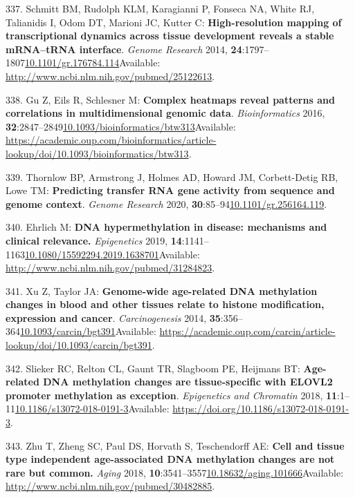 \documentclass[
]{book}
\begin{document}
\leavevmode\hypertarget{ref-Schmitt2014b}{}%
337. Schmitt BM, Rudolph KLM, Karagianni P, Fonseca NA, White RJ, Talianidis I, Odom DT, Marioni JC, Kutter C: \textbf{High-resolution mapping of transcriptional dynamics across tissue development reveals a stable mRNA--tRNA interface}. \emph{Genome Research} 2014, \textbf{24}:1797--1807\href{https://doi.org/10.1101/gr.176784.114}{10.1101/gr.176784.114}Available: \url{http://www.ncbi.nlm.nih.gov/pubmed/25122613}.

\leavevmode\hypertarget{ref-Gu2016}{}%
338. Gu Z, Eils R, Schlesner M: \textbf{Complex heatmaps reveal patterns and correlations in multidimensional genomic data}. \emph{Bioinformatics} 2016, \textbf{32}:2847--2849\href{https://doi.org/10.1093/bioinformatics/btw313}{10.1093/bioinformatics/btw313}Available: \url{https://academic.oup.com/bioinformatics/article-lookup/doi/10.1093/bioinformatics/btw313}.

\leavevmode\hypertarget{ref-Thornlow2020}{}%
339. Thornlow BP, Armstrong J, Holmes AD, Howard JM, Corbett-Detig RB, Lowe TM: \textbf{Predicting transfer RNA gene activity from sequence and genome context}. \emph{Genome Research} 2020, \textbf{30}:85--94\href{https://doi.org/10.1101/gr.256164.119}{10.1101/gr.256164.119}.

\leavevmode\hypertarget{ref-Ehrlich2019}{}%
340. Ehrlich M: \textbf{DNA hypermethylation in disease: mechanisms and clinical relevance.} \emph{Epigenetics} 2019, \textbf{14}:1141--1163\href{https://doi.org/10.1080/15592294.2019.1638701}{10.1080/15592294.2019.1638701}Available: \url{http://www.ncbi.nlm.nih.gov/pubmed/31284823}.

\leavevmode\hypertarget{ref-Xu2014b}{}%
341. Xu Z, Taylor JA: \textbf{Genome-wide age-related DNA methylation changes in blood and other tissues relate to histone modification, expression and cancer}. \emph{Carcinogenesis} 2014, \textbf{35}:356--364\href{https://doi.org/10.1093/carcin/bgt391}{10.1093/carcin/bgt391}Available: \url{https://academic.oup.com/carcin/article-lookup/doi/10.1093/carcin/bgt391}.

\leavevmode\hypertarget{ref-Slieker2018}{}%
342. Slieker RC, Relton CL, Gaunt TR, Slagboom PE, Heijmans BT: \textbf{Age-related DNA methylation changes are tissue-specific with ELOVL2 promoter methylation as exception}. \emph{Epigenetics and Chromatin} 2018, \textbf{11}:1--11\href{https://doi.org/10.1186/s13072-018-0191-3}{10.1186/s13072-018-0191-3}Available: \url{https://doi.org/10.1186/s13072-018-0191-3}.

\leavevmode\hypertarget{ref-Zhu2018}{}%
343. Zhu T, Zheng SC, Paul DS, Horvath S, Teschendorff AE: \textbf{Cell and tissue type independent age-associated DNA methylation changes are not rare but common.} \emph{Aging} 2018, \textbf{10}:3541--3557\href{https://doi.org/10.18632/aging.101666}{10.18632/aging.101666}Available: \url{http://www.ncbi.nlm.nih.gov/pubmed/30482885}.
\end{document}
